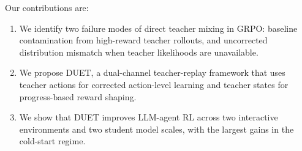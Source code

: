 Our contributions are:
\begin{enumerate}
    \item We identify two failure modes of direct teacher mixing in GRPO: baseline contamination from high-reward teacher rollouts, and uncorrected distribution mismatch when teacher likelihoods are unavailable.

    \item We propose DUET, a dual-channel teacher-replay framework that uses teacher actions for corrected action-level learning and teacher states for progress-based reward shaping.

    \item We show that DUET improves LLM-agent RL across two interactive environments and two student model scales, with the largest gains in the cold-start regime.
\end{enumerate}
